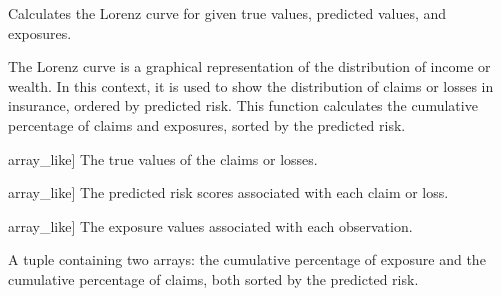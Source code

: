 \documentclass[letterpaper,10pt,english]{sphinxmanual}
\begin{document}
\begin{fulllineitems}
\label{\detokenize{utils:utils.lorenz_curve}}
\pysigstartsignatures
{}
\pysigstopsignatures
\sphinxAtStartPar
Calculates the Lorenz curve for given true values, predicted values, and exposures.

\sphinxAtStartPar
The Lorenz curve is a graphical representation of the distribution of income or wealth. In this context,
it is used to show the distribution of claims or losses in insurance, ordered by predicted risk. This function
calculates the cumulative percentage of claims and exposures, sorted by the predicted risk.
\begin{description}
\begin{description}
\sphinxlineitem{y\_true}{[}array\_like{]}
\sphinxAtStartPar
The true values of the claims or losses.

\sphinxlineitem{y\_pred}{[}array\_like{]}
\sphinxAtStartPar
The predicted risk scores associated with each claim or loss.

\sphinxlineitem{exposure}{[}array\_like{]}
\sphinxAtStartPar
The exposure values associated with each observation.

\end{description}

\begin{description}
\sphinxAtStartPar
A tuple containing two arrays: the cumulative percentage of exposure and the cumulative percentage of claims,
both sorted by the predicted risk.

\end{description}


\end{description}
\end{fulllineitems}
\end{document}
